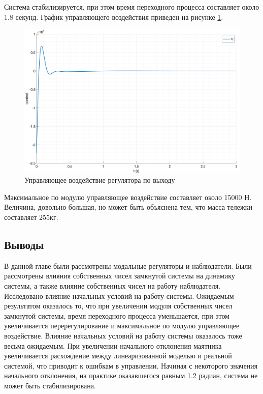 Система стабилизируется, при этом время переходного процесса составляет около 1.8 секунд. 
График управляющего воздействия приведен на рисунке \ref{fig:modal_controller_obderver_u}.
\begin{figure}[ht!]
    \centering
    \includegraphics[width=\textwidth]{media/plots/observer_controller/observer_controller_u.png}
    \caption{Управляющее воздействие регулятора по выходу}
    \label{fig:modal_controller_obderver_u}
\end{figure}
Максимальное по модулю управляющее воздействие составляет около 15000 Н. Величина, довольно большая, 
но может быть объяснена тем, что масса тележки составляет 255кг. 

\FloatBarrier
\subsection{Выводы} 
В данной главе были рассмотрены модальные регуляторы и наблюдатели. Были рассмотрены влияния собственных 
чисел замкнутой системы на динамику системы, а также влияние собственных чисел на работу наблюдателя. 
Исследовано влияние начальных условий на работу системы. Ожидаемым результатом оказалось то, что 
при увеличении модуля собственных чисел замкнутой системы, время переходного процесса уменьшается, 
при этом увеличивается перерегулирование и максимальное по модулю управляющее воздействие. 
Влияние начальных условий на работу системы оказалось тоже весьма ожидаемым. При увеличении 
начального отклонения маятника увеличивается расхождение между линеаризованной моделью и реальной системой, 
что приводит к ошибкам в управлении. Начиная с некоторого значения начального отклонения, 
на практике оказавшегося равным 1.2 радиан, система не может быть стабилизирована. 